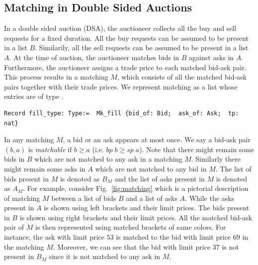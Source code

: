 \documentclass[a4paper,UKenglish,cleveref, autoref]{lipics-v2019}
\begin{document}
\subsection{Matching in Double Sided Auctions}
In a double sided auction (DSA), the auctioneer collects all the buy and sell requests for a fixed duration. All the buy requests can be assumed to be present in a list $B$. Similarily, all the sell requests can be assumed to be present in a list $A$. At the time of auction, the auctioneer matches bids in $B$ against asks in $A$. Furthermore, the auctioneer assigns a trade price to each matched bid-ask pair. This  process results in  a matching $M$, which consists of all the matched bid-ask pairs together with their trade prices. We represent matching as a list whose entries are of type .
\begin{verbatim}
Record fill_type: Type:=  Mk_fill {bid_of: Bid;  ask_of: Ask;  tp: nat} 
\end{verbatim}

In any matching $M$, a bid or an ask appears at most once. We say a bid-ask pair $(b, a)$ is \emph{matchable} if $b \ge a$ (i.e. $bp \; b \ge sp \; a$). Note that there might remain some bids in $B$ which are not matched to any ask in a matching $M$. Similarly there might remain some asks in $A$ which are not matched to any bid in $M$. The list of bids present in $M$ is denoted as $B_{M}$ and the list of asks present in $M$ is denoted as $A_M$. For example, consider Fig.~\ref{fig:matching} which is a pictorial description of matching $M$ between a list of bids $B$ and a list of asks $A$. While the asks present in $A$ is shown using left brackets and their limit prices. The bids present in $B$ is shown using right brackets and their limit prices.  All the matched bid-ask pair of $M$ is then represented using matched brackets of same colors. For instance, the ask with limit price $53$ is matched to the bid with limit price $69$ in the matching $M$. Moreover, we can see that the bid with limit price $37$ is not present in $B_M$ since it is not matched to any ask in $M$.    
\end{document}
